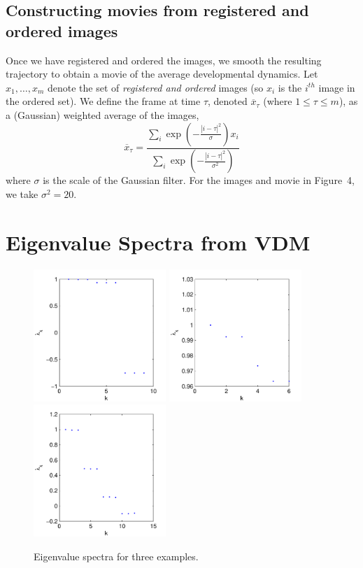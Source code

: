 \documentclass[12pt]{article}
\begin{document}
\subsection{Constructing movies from registered and ordered images}

Once we have registered and ordered the images, we smooth the resulting trajectory to obtain a movie of the average developmental dynamics. 
%
Let $x_1, \dots, x_m$ denote the set of {\em registered and ordered} images (so $x_i$ is the $i^{th}$ image in the ordered set).
%
We define the frame at time $\tau$, denoted $\overline{x}_{\tau}$ (where $1 \le \tau \le m$), as a (Gaussian) weighted average of the images,
\begin{equation}
\overline{x}_{\tau} =  \frac{\sum_i \exp \left( - \frac{|i - \tau|^2}{\sigma} \right) x_i}{\sum_i \exp \left( - \frac{|i - \tau|^2}{\sigma^2} \right) }
\end{equation}
where $\sigma$ is the scale of the Gaussian filter. 
%
For the images and movie in Figure~4, we take $\sigma^2 = 20$.
%
 
\section{Eigenvalue Spectra from VDM}


\begin{figure}[H]
\includegraphics[width=5cm]{data1_evals}
\includegraphics[width=5cm]{data2_evals}
\includegraphics[width=5cm]{data3_evals}
\caption{Eigenvalue spectra for three examples.}
\end{figure}
\end{document}
